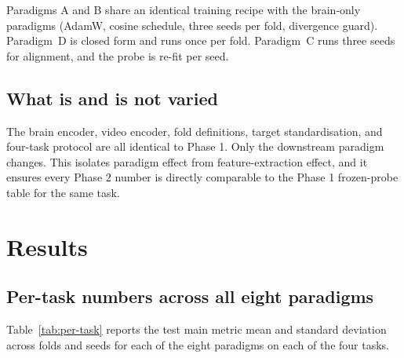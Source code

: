 \documentclass[11pt, a4paper]{article}
\begin{document}
Paradigms A and B share an identical training recipe with the brain-only paradigms
(AdamW, cosine schedule, three seeds per fold, divergence guard). Paradigm~D is closed
form and runs once per fold. Paradigm~C runs three seeds for alignment, and the probe is
re-fit per seed.

\subsection{What is and is not varied}
The brain encoder, video encoder, fold definitions, target standardisation, and four-task
protocol are all identical to Phase 1. Only the downstream paradigm changes. This isolates
paradigm effect from feature-extraction effect, and it ensures every Phase 2 number is
directly comparable to the Phase 1 frozen-probe table for the same task.

\section{Results}
\label{sec:results}

\subsection{Per-task numbers across all eight paradigms}
Table~\ref{tab:per-task} reports the test main metric mean and standard deviation across
folds and seeds for each of the eight paradigms on each of the four tasks.
\end{document}
